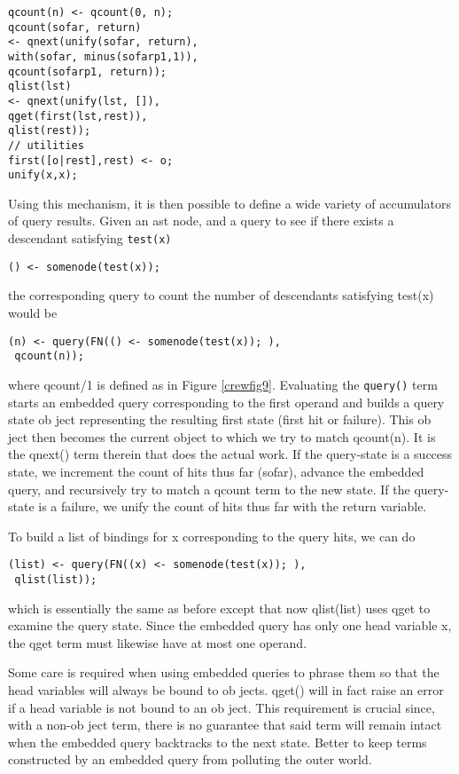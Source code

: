 \begin{verbatim}
qcount(n) <- qcount(0, n);
qcount(sofar, return)
<- qnext(unify(sofar, return),
with(sofar, minus(sofarp1,1)),
qcount(sofarp1, return));
qlist(lst)
<- qnext(unify(lst, []),
qget(first(lst,rest)),
qlist(rest));
// utilities
first([o|rest],rest) <- o;
unify(x,x);
\end{verbatim}

Using this mechanism, it is then possible to define
a wide variety of accumulators of query results. Given
an ast node, and a query to see if there exists a descendant
satisfying \verb|test(x)|
\begin{verbatim}
() <- somenode(test(x));
\end{verbatim}
the corresponding query to count the number of descendants
satisfying test(x) would be
\begin{verbatim}
(n) <- query(FN(() <- somenode(test(x)); ),
 qcount(n));
\end{verbatim}
where qcount/1 is defined as in Figure \ref{crewfig9}. Evaluating the
\verb|query()| term starts an embedded query corresponding to the first operand
and builds a query state ob ject representing the resulting first state (first
hit or failure). This ob ject then becomes the current object to which we try to
match qcount(n). It is the qnext() term therein that does the actual work. If
the query-state is a success state, we increment the count of hits thus far
(sofar), advance the embedded query, and recursively try to match a qcount term
to the new state. If the query-state is a failure, we unify the count of hits
thus far with the return variable.

To build a list of bindings for x corresponding to the
query hits, we can do
\begin{verbatim}
(list) <- query(FN((x) <- somenode(test(x)); ),
 qlist(list));
\end{verbatim}
which is essentially the same as before except that now
qlist(list) uses qget to examine the query state.
Since the embedded query has only one head variable
x, the qget term must likewise have at most one
operand.

Some care is required when using embedded queries
to phrase them so that the head variables will always
be bound to ob jects. qget() will in fact raise an error
if a head variable is not bound to an ob ject. This
requirement is crucial since, with a non-ob ject term,
there is no guarantee that said term will remain intact
when the embedded query backtracks to the next
state. Better to keep terms constructed by an embedded
query from polluting the outer world.

